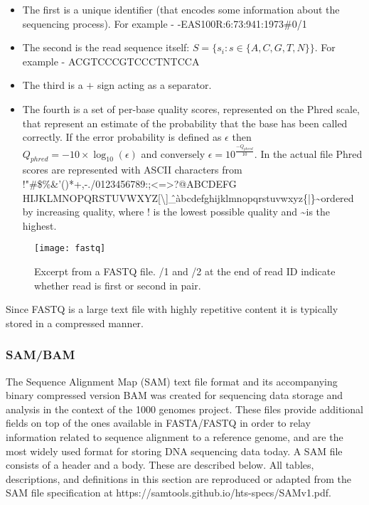 \begin{itemize}
    \item The first is a unique identifier (that encodes some information about the sequencing process). For example - \@HWUSI-EAS100R:6:73:941:1973\#0/1
    \item The second is the read sequence itself: $S = \{s_i: s \in\{A,C,G,T,N\}\}$. For example - ACGTCCCGTCCCTNTCCA
    \item The third is a $+$ sign acting as a separator.
    \item The fourth is a set of per-base quality scores, represented on the Phred scale, that represent an estimate of the probability that the base has been called correctly. If the error probability is defined as $\epsilon$ then $Q_{phred} = -10\times\log_{10}(\epsilon)$ and conversely $\epsilon = 10^{\frac{-Q_{phred}}{10}}$. In the actual file Phred scores are represented with ASCII characters from !"\#\$\%\&'()*+,-./0123456789:;<=>?@ABCDEFG HIJKLMNOPQRSTUVWXYZ[\textbackslash]\^\_\`abcdefghijklmnopqrstuvwxyz\{|\}\textasciitilde ordered by increasing quality, where ! is the lowest possible quality and \textasciitilde is the highest.
\end{itemize}

\begin{figure}[H]
    \texttt{[image: fastq]}
    \centering
    \caption {Excerpt from a FASTQ file. /1 and /2 at the end of read ID indicate whether read is first or second in pair.}
    \label{fig:fastq}
\end{figure}

Since FASTQ is a large text file with highly repetitive content it is typically stored in a compressed manner.

\subsubsection{SAM/BAM}
\label{sec:bg_sam_bam}

The Sequence Alignment Map (SAM) text file format and its accompanying binary compressed version BAM was created for sequencing data storage and analysis in the context of the 1000 genomes project\autocite{li2009sequence}. These files provide additional fields on top of the ones available in FASTA/FASTQ in order to relay information related to sequence alignment to a reference genome, and are the most widely used format for storing DNA sequencing data today. A SAM file consists of a header and a body. These are described below. All tables, descriptions, and definitions in this section are reproduced or adapted from the SAM file specification at https://samtools.github.io/hts-specs/SAMv1.pdf.

